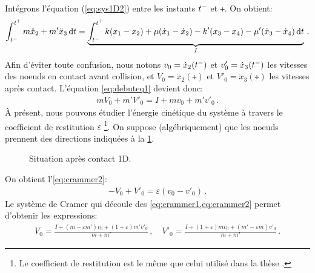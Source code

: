 \noindent Intégrons l'équation (\ref{eq:sys1D2}) entre les instants $t^{-}$ et $\tplus$. On obtient:
\begin{align}    \label{eq:debuteq1}
    \int_{\tmoins}^{\tplus} m\ddot x_2 + m'\ddot x_3 \diff t = \underbrace{\int_{\tmoins}^{\tplus} k(x_1 - x_2) + \mu (\dot x_1 - \dot x_2) - k'(x_3 - x_4) - \mu'(\dot x_3 - \dot x_4) \diff t}_{I} \,.
\end{align}
Afin d'éviter toute confusion, nous notons $v_0 = \dot{x}_2(t^{-})$ et $v'_0 = \dot{x}_3(t^{-})$ les vitesses des noeuds en contact avant collision, et $V_0 = \dot{x}_2(\tplus)$ et $V'_0 = \dot{x}_3(\tplus)$ les vitesses après contact. L'équation \cref{eq:debuteq1} devient donc:
\begin{align} \label{eq:crammer1}
    mV_0 + m'V'_0 = I + mv_0 + m'v'_0 \,.
\end{align}
À présent, nous pouvons étudier l'énergie cinétique du système à travers le coefficient de restitution $\varepsilon$ \footnote{Le coefficient de restitution est le même que celui utilisé dans la thèse \parencite{rabatel2015thesis}.}. On suppose (algébriquement) que les noeuds prennent des directions indiquées à la \cref{fig:contact1dapres}. 
\begin{figure}[!h]
    \centering
    \caption{Situation après contact 1D.}
    \label{fig:contact1dapres}
\end{figure}

\noindent On obtient l'\cref{eq:crammer2}:
\begin{align} \label{eq:crammer2}
    - V_0 + V'_0 = \varepsilon (v_0 - v'_0) \,.
\end{align}
Le système de Cramer qui découle des \cref{eq:crammer1,eq:crammer2} permet d'obtenir les expressions:
\begin{align} \label{eq:vitessesapres1D}
    V_0 = \frac{I + (m-\varepsilon m')v_0 + (1+\varepsilon)m'v'_0}{m+m'} \,, \quad V'_0 = \frac{I + (1+\varepsilon)mv_0 + (m'-\varepsilon m)v'_0}{m+m'}\,.
\end{align}


